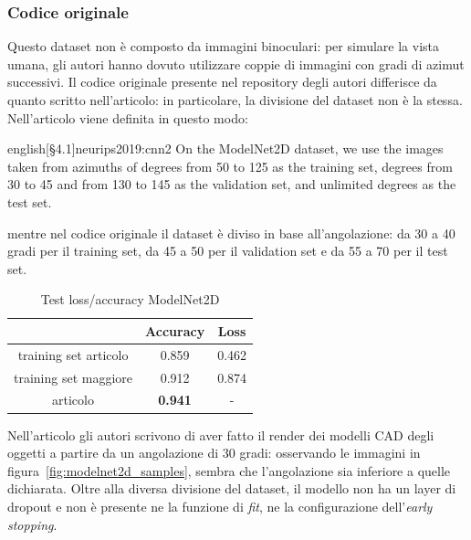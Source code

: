 \documentclass[italian,12pt,a4paper,oneside,final]{report}
\begin{document}
\subsubsection{Codice originale}
Questo dataset non è composto da immagini binoculari: per simulare la vista umana, gli autori hanno dovuto utilizzare coppie di immagini con gradi di azimut successivi.
Il codice originale presente nel repository degli autori differisce da quanto scritto nell'articolo: in particolare, la divisione del dataset non è la stessa.
Nell'articolo viene definita in questo modo:
\begin{foreigndisplaycquote}{english}[\S4.1]{neurips2019:cnn2}
On the ModelNet2D dataset, we use the images taken from azimuths of degrees from 50 to 125 as the training set, degrees from 30 to 45 and from 130 to 145 as the validation set, and unlimited degrees as the test set.
\end{foreigndisplaycquote}
mentre nel codice originale il dataset è diviso in base all'angolazione: da 30 a 40 gradi per il training set, da 45 a 50 per il validation set e da 55 a 70 per il test set.
\begin{table}[!ht]
	\centering
	\begin{tabular}[t]{|c|cc|}
		\hline
		& \textbf{Accuracy} & \textbf{Loss} \\
		\hline
		training set articolo& 0.859 & 0.462 \\
		training set maggiore& 0.912 & 0.874 \\
		articolo & \textbf{0.941} & - \\
		\hline
	\end{tabular}
	\caption{Test loss/accuracy ModelNet2D}
	\label{tab:modelnet2d_val_loss_acc_pt}
\end{table}
Nell'articolo gli autori scrivono di aver fatto il render dei modelli CAD degli oggetti a partire da un angolazione di 30 gradi: osservando le immagini in figura~\ref{fig:modelnet2d_samples}, sembra che l'angolazione sia inferiore a quelle dichiarata.
Oltre alla diversa divisione del dataset, il modello non ha un layer di dropout e non è presente ne la funzione di \textit{fit}, ne la configurazione dell'\textit{early stopping}.
\end{document}
